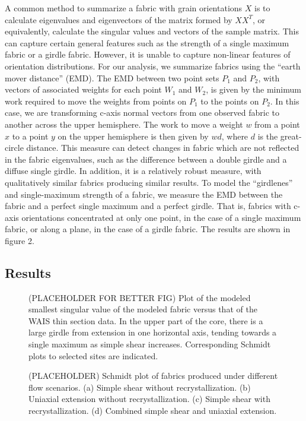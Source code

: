 \documentclass[TC, hvmath, online]{copernicus}
\begin{document}
{A common method to summarize a fabric with grain orientations $X$ is to calculate eigenvalues and eigenvectors of the matrix formed by $X X^T$, or equivalently, calculate the singular values and vectors of the sample matrix. This can capture certain general features such as the strength of a single maximum fabric or a girdle fabric. However, it is unable to capture non-linear features of orientation distributions. For our analysis, we summarize fabrics using the ``earth mover distance'' (EMD). The EMD between two point sets $P_1$ and $P_2$, with vectors of associated weights for each point $W_1$ and $W_2$, is given by the minimum work required to move the weights from points on $P_1$ to the points on $P_2$. In this case, we are transforming c-axis normal vectors from one observed fabric to another across the upper hemisphere. The work to move a weight $w$ from a point $x$ to a point $y$ on the upper hemisphere is then given by ${wd}$, where $d$ is the great-circle distance. This measure can detect changes in fabric which are not reflected in the fabric eigenvalues, such as the difference between a double girdle and a diffuse single girdle. In addition, it is a relatively robust measure, with qualitatively similar fabrics producing similar results. To model the ``girdlenes'' and single-maximum strength of a fabric, we measure the EMD between the fabric and a perfect single maximum and a perfect girdle. That is, fabrics with c-axis orientations concentrated at only one point, in the case of a single maximum fabric, or along a plane, in the case of a girdle fabric. The results are shown in figure 2. 


\subsection{Results}

\begin{figure}
\caption{(PLACEHOLDER FOR BETTER FIG) Plot of the modeled smallest  singular value of the modeled fabric versus that of the WAIS thin section data. In the upper part of the core, there is a large girdle from extension in one horizontal axis, tending towards a single maximum as simple shear increases. Corresponding Schmidt plots to selected sites are indicated.}
\end{figure}
\begin{figure}
\caption{(PLACEHOLDER) Schmidt plot of fabrics produced under different flow scenarios. (a) Simple shear without recrystallization. (b) Uniaxial extension without recrystallization. (c) Simple shear with recrystallization. (d) Combined simple shear and uniaxial extension.} 
\end{figure}

}
\end{document}
